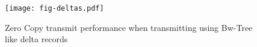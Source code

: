 \begin{figure}[H]
\texttt{[image: fig-deltas.pdf]}
\caption{Zero Copy transmit performance when transmitting using 
Bw-Tree like delta records}
\label{fig:deltas}
\end{figure}
